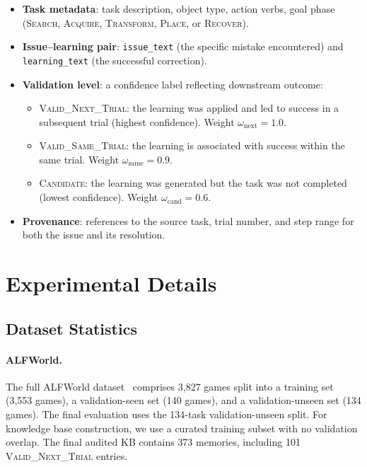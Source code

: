 \begin{itemize}
    \item \textbf{Task metadata}: task description, object type, action verbs, goal phase (\textsc{Search}, \textsc{Acquire}, \textsc{Transform}, \textsc{Place}, or \textsc{Recover}).
    \item \textbf{Issue--learning pair}: \texttt{issue\_text} (the specific mistake encountered) and \texttt{learning\_text} (the successful correction).
    \item \textbf{Validation level}: a confidence label reflecting downstream outcome:
    \begin{itemize}
        \item \textsc{Valid\_Next\_Trial}: the learning was applied and led to success in a subsequent trial (highest confidence). Weight $\omega_{\text{next}} = 1.0$.
        \item \textsc{Valid\_Same\_Trial}: the learning is associated with success within the same trial. Weight $\omega_{\text{same}} = 0.9$.
        \item \textsc{Candidate}: the learning was generated but the task was not completed (lowest confidence). Weight $\omega_{\text{cand}} = 0.6$.
    \end{itemize}
    \item \textbf{Provenance}: references to the source task, trial number, and step range for both the issue and its resolution.
\end{itemize}

\section{Experimental Details}
\label{app:experimental-details}

\subsection{Dataset Statistics}

\paragraph{ALFWorld.}
The full ALFWorld dataset~\citep{shridhar2021alfworld} comprises 3{,}827 games split into a training set (3{,}553 games), a validation-seen set (140 games), and a validation-unseen set (134 games). The final evaluation uses the 134-task validation-unseen split. For knowledge base construction, we use a curated training subset with no validation overlap. The final audited KB contains 373 memories, including 101 \textsc{Valid\_Next\_Trial} entries.

